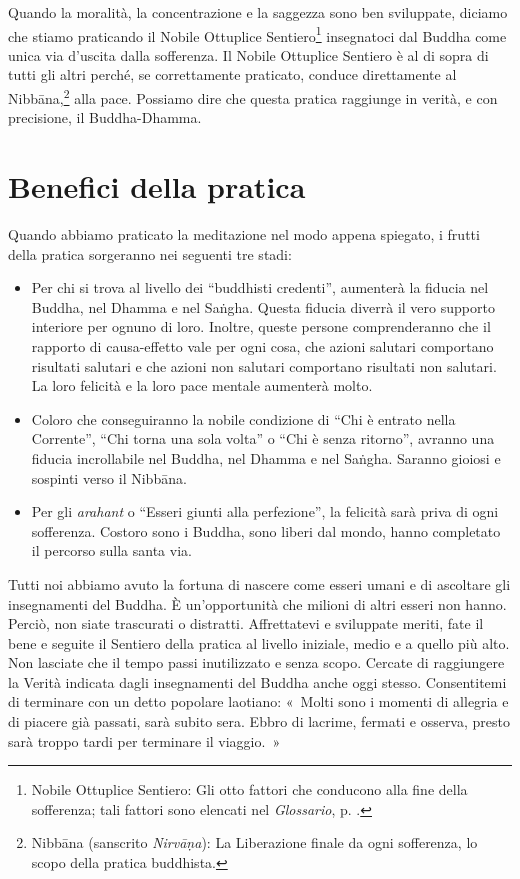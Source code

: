 Quando la moralità, la concentrazione e la saggezza sono ben sviluppate,
diciamo che stiamo praticando il Nobile Ottuplice Sentiero\footnote{Nobile
  Ottuplice Sentiero: Gli otto fattori che conducono alla fine della
  sofferenza; tali fattori sono elencati nel \emph{Glossario}, p. \pageref{glossary-ottuplice}.}
insegnatoci dal Buddha come unica via d'uscita dalla sofferenza. Il
Nobile Ottuplice Sentiero è al di sopra di tutti gli altri perché, se
correttamente praticato, conduce direttamente al
Nibbāna,\footnote{Nibbāna (sanscrito \emph{Nirvāṇa}): La
  Liberazione finale da ogni sofferenza, lo scopo della pratica
  buddhista.} alla pace. Possiamo dire che questa pratica raggiunge in
verità, e con precisione, il Buddha-Dhamma.

\section{Benefici della pratica}

Quando abbiamo praticato la meditazione nel modo appena spiegato, i
frutti della pratica sorgeranno nei seguenti tre stadi:

\begin{itemize}

\item Per chi si trova al livello dei ``buddhisti credenti'', aumenterà
  la fiducia nel Buddha, nel Dhamma e nel Saṅgha. Questa fiducia diverrà
  il vero supporto interiore per ognuno di loro. Inoltre, queste persone
  comprenderanno che il rapporto di causa-effetto vale per ogni cosa,
  che azioni salutari comportano risultati salutari e che azioni non
  salutari comportano risultati non salutari. La loro felicità e la loro
  pace mentale aumenterà molto.

\item Coloro che conseguiranno la nobile condizione di ``Chi è entrato nella
  Corrente'', ``Chi torna una sola volta'' o ``Chi è senza ritorno'', avranno
  una fiducia incrollabile nel Buddha, nel Dhamma e nel Saṅgha. Saranno gioiosi
  e sospinti verso il Nibbāna.

\item Per gli \emph{arahant} o ``Esseri giunti alla perfezione'', la felicità
  sarà priva di ogni sofferenza. Costoro sono i Buddha, sono liberi dal mondo,
  hanno completato il percorso sulla santa via.

\end{itemize}

Tutti noi abbiamo avuto la fortuna di nascere come esseri umani e di
ascoltare gli insegnamenti del Buddha. È un'opportunità che milioni di
altri esseri non hanno. Perciò, non siate trascurati o distratti.
Affrettatevi e sviluppate meriti, fate il bene e seguite il Sentiero
della pratica al livello iniziale, medio e a quello più alto. Non
lasciate che il tempo passi inutilizzato e senza scopo. Cercate di
raggiungere la Verità indicata dagli insegnamenti del Buddha anche oggi
stesso. Consentitemi di terminare con un detto popolare laotiano:
«~Molti sono i momenti di allegria e di piacere già passati, sarà subito
sera. Ebbro di lacrime, fermati e osserva, presto sarà troppo tardi per
terminare il viaggio.~»


